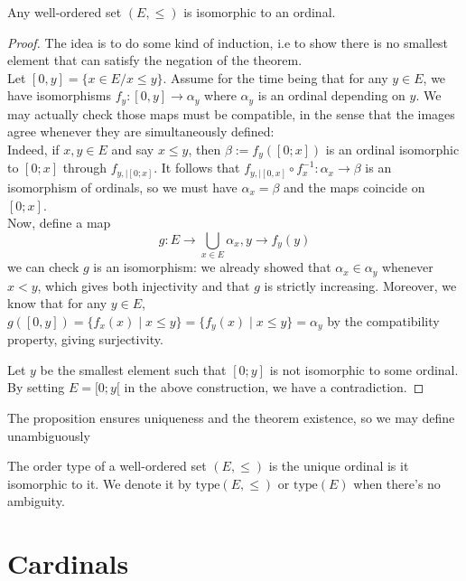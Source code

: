 \documentclass{article}
\begin{document}
\begin{theorem}
    Any well-ordered set $(E, \leq)$ is isomorphic to an ordinal.
\end{theorem}

\begin{proof}
    The idea is to do some kind of induction, i.e to show there is no smallest element that can satisfy the negation of the theorem.\\
    
    Let $[0,y] = \{ x \in E / x \leq y \}$. Assume for the time being that for any $y \in E$, we have isomorphisms $f_y: [0, y] \to \alpha_y$ where $\alpha_y$ is an ordinal depending on $y$. We may actually check those maps must be compatible, in the sense that the images agree whenever they are simultaneously defined:\\
    Indeed, if $x, y \in E$ and say $x \leq y$, then $\beta := f_y([0;x])$ is an ordinal isomorphic to $[0;x]$ through $f_{y, |[0;x]}$. It follows that $f_{y, |[0, x]} \circ f_x^{-1}: \alpha_x \to \beta$ is an isomorphism of ordinals, so we must have $\alpha_x = \beta$ and the maps coincide on $[0;x]$.\\
    
    Now, define a map $$g: E \to \bigcup_{x \in E}{\alpha_x}, y \to f_y(y)$$ we can check $g$ is an isomorphism: we already showed that $\alpha_x \in \alpha_y$ whenever $x < y$, which gives both injectivity and that $g$ is strictly increasing. Moreover, we know that for any $y \in E$, $g([0,y]) = \{f_x(x) \mid x \leq y \} = \{f_y(x) \mid x \leq y\} = \alpha_y$ by the compatibility property, giving surjectivity.
    
    Let $y$ be the smallest element such that $[0; y]$ is not isomorphic to some ordinal. By setting $E = [0; y[$ in the above construction, we have a contradiction.
\end{proof}

The proposition ensures uniqueness and the theorem existence, so we may define unambiguously
\begin{definition}
    The order type of a well-ordered set $(E, \leq)$ is the unique ordinal is it isomorphic to it. We denote it by $\mathrm{type}(E, \leq)$ or $\mathrm{type}(E)$ when there's no ambiguity.
\end{definition}

\section{Cardinals}
\end{document}
